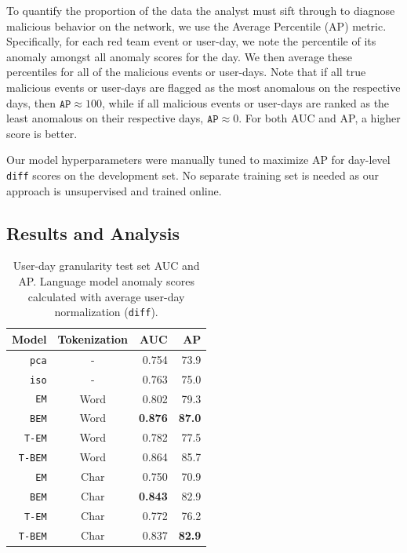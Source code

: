 \documentclass[letterpaper]{article} %
\begin{document}
To quantify the proportion of the data the analyst must sift through to diagnose malicious behavior on the network, we use the Average Percentile (AP) metric.
Specifically, for each red team event or user-day, we note the percentile of its anomaly amongst all anomaly scores for the day.  
We then average these percentiles for all of the malicious events or user-days.
Note that if all true malicious events or user-days are flagged as the most anomalous on the respective days, then $\texttt{AP} \approx 100$, while if all malicious events or user-days are ranked as the least anomalous on their respective days, $\texttt{AP} \approx 0$.
For both AUC and AP, a higher score is better.

Our model hyperparameters were manually tuned to maximize AP for day-level \texttt{diff} scores on the development set.  No separate training set is needed as our approach is unsupervised and trained online.

\subsection{Results and Analysis}

\begin{table}
    \centering
    \begin{tabular}{|r|c|r|r|} \hline 
        {\bf Model} & {\bf Tokenization}  & {\bf AUC} & {\bf AP} \\\hline
        \verb|pca|   & -          & 0.754 & 73.9 \\\hline
        \verb|iso|   & -          & 0.763 & 75.0 \\\hline\hline
        \verb|EM|    & Word       & 0.802 &79.3 \\\hline
        \verb|BEM|   & Word       & {\bf 0.876} & {\bf 87.0}\\\hline
        \verb|T-EM|  & Word       & 0.782 &  77.5 \\\hline
        \verb|T-BEM| & Word       & 0.864 &  85.7 \\\hline\hline
        \verb|EM|    & Char       & 0.750  & 70.9\\\hline
        \verb|BEM|   & Char       &{\bf 0.843}  & {82.9}\\\hline
        \verb|T-EM|  & Char       & 0.772 & 76.2\\\hline
        \verb|T-BEM| & Char       & { 0.837} & {\bf 82.9}\\\hline
    \end{tabular}
    \caption{User-day granularity test set AUC and AP. Language model anomaly scores calculated with average user-day normalization (\texttt{diff}).} \label{tab:aucap}
\end{table}
\end{document}
